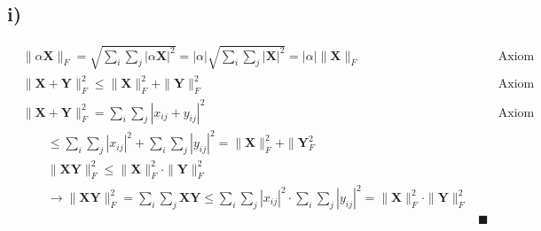 \subsection*{i)}
\begin{align*}
	&\|\alpha\mathbf{X}\|_{F}=\sqrt{\sum_{i}\sum_{j}\left|\alpha\mathbf{X}\right|^{2}}=\left|\alpha\right|\sqrt{\sum_{i}\sum_{j}\left|\mathbf{X}\right|^{2}}=\left|\alpha\right|\|\mathbf{X}\|_{F}& &\text{Axiom 2}& \\
	&\|\mathbf{X+Y}\|_{F}^{2}\le\|\mathbf{X}\|_{F}^{2}+\|\mathbf{Y}\|_{F}^{2}& &\text{Axiom 3}& \\
	&\|\mathbf{X+Y}\|_{F}^{2}=\sum_{i}\sum_{j}\left|x_{ij}+y_{ij}\right|^{2}& &\text{Axiom 4}& \\
	&\qquad\le\sum_{i}\sum_{j}\left|x_{ij}\right|^{2}+\sum_{i}\sum_{j}\left|y_{ij}\right|^{2}=\|\mathbf{X}\|_{F}^{2}+\|\mathbf{Y}_{F}^{2}& \\
	&\qquad\|\mathbf{XY}\|_{F}^{2}\le\|\mathbf{X}\|_{F}^{2}\cdot\|\mathbf{Y}\|_{F}^{2}& \\
	&\qquad\rightarrow\|\mathbf{XY}\|_{F}^{2}=\sum_{i}\sum_{j}\mathbf{XY}\le\sum_{i}\sum_{j}\left|x_{ij}\right|^{2}\cdot\sum_{i}\sum_{j}\left|y_{ij}\right|^{2}=\|\mathbf{X}\|_{F}^{2}\cdot\|\mathbf{Y}\|_{F}^{2} & \\
	& &\blacksquare
\end{align*}

